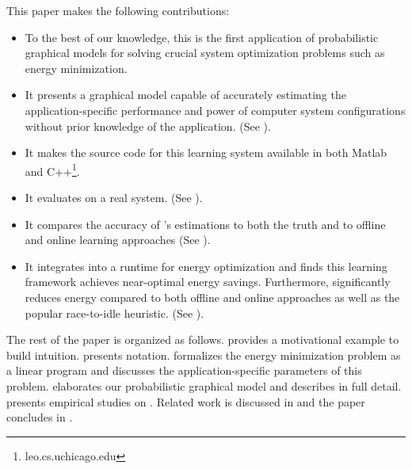 This paper makes the following contributions:
\begin{itemize}
\item To the best of our knowledge, this is the first application of
  probabilistic graphical models for solving crucial system
  optimization problems such as energy minimization.
\item It presents a graphical model capable of accurately
  estimating the application-specific performance and power of
  computer system configurations without prior knowledge of the
  application. (See ).
\item It makes the source code for this learning system available in
  both Matlab and C++\footnote{leo.cs.uchicago.edu}.
\item It evaluates \SYSTEM{} on a real system. (See
  ).
\item It compares the accuracy of \SYSTEM{}'s estimations to both the
  truth and to offline and online learning approaches (See
  ).
\item It integrates \SYSTEM{} into a runtime for energy optimization
  and finds this learning framework achieves near-optimal energy
  savings.  Furthermore, \SYSTEM{} significantly reduces energy
  compared to both offline and online approaches as well as the
  popular race-to-idle heuristic.  (See
  ).
\end{itemize}

The rest of the paper is organized as follows. 
provides a motivational example to build intuition.
 presents notation.
 formalizes the energy minimization
problem as a linear program and discusses the application-specific
parameters of this problem.   elaborates our probabilistic graphical model and describes \SYSTEM{} in full detail.
 presents empirical studies on \SYSTEM{}.
Related work is discussed in  and the paper
concludes in .
